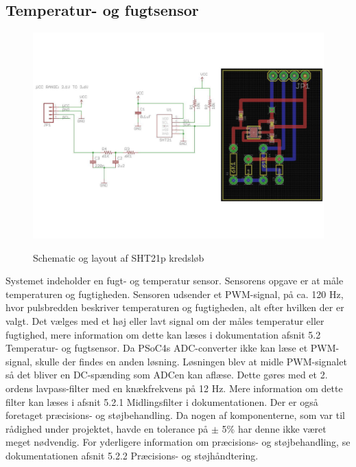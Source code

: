 \subsection{Temperatur- og fugtsensor}


\begin{figure}[htb]
\centering
{\includegraphics[width=\textwidth]{billeder/SHT_pcb}}
\caption{Schematic og layout af SHT21p kredsl\o{}b}
\label{lab:SHT21p-kredsloeb}
\end{figure}

Systemet indeholder  en fugt- og temperatur sensor. Sensorens opgave er at måle temperaturen og fugtigheden.
Sensoren udsender et PWM-signal, på ca. 120 Hz, hvor pulsbredden beskriver temperaturen og fugtigheden,  alt efter hvilken der er valgt. Det vælges med et høj eller lavt signal om der måles temperatur eller fugtighed, mere information om dette kan læses i dokumentation afsnit 5.2 Temperatur- og fugtsensor.
Da PSoC4s ADC-converter ikke kan læse et PWM-signal, skulle der findes en anden løsning. Løsningen blev at midle PWM-signalet så det bliver en DC-spænding som ADCen kan aflæse. Dette gøres med et 2. ordens lavpass-filter med en knækfrekvens på 12 Hz. Mere information om dette filter kan læses i afsnit 5.2.1 Midlingsfilter i dokumentationen. 
Der er også foretaget præcisions- og støjbehandling. Da nogen af komponenterne, som var til rådighed under projektet, havde en tolerance på $\pm$ 5\% har denne ikke været meget nødvendig. For yderligere information om præcisions- og støjbehandling, se dokumentationen afsnit 5.2.2 Præcisions- og støjhåndtering. 
